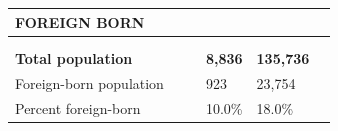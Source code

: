 \documentclass[9pt]{report}
\begin{document}
\newpage
\setlength{\tabcolsep}{.01in} %
\begin{tabular}{p{.10in}p{.10in}p{.10in}p{3.7in}>{\hfill}p{.85in}>{\hfill}p{.85in}>{\hfill}p{.85in}>{\hfill}p{.85in}p{0.1in}}
\multicolumn{9}{l}{\parbox{7.1in}{\raggedright{\large{\strut\textbf{FOREIGN BORN}\strut}}}} \\ 
\hline
\multicolumn{4}{l}{\parbox{3.5in}{\raggedright{\textbf{}}}} & \multicolumn{1}{r}{\parbox{.85in}{\strut\raggedleft{\textbf{}\strut}}} & \multicolumn{1}{r}{\parbox{.85in}{\strut\raggedleft{\textbf{}\strut}}} & \multicolumn{1}{r}{\parbox{.85in}{\strut{}}} & \multicolumn{1}{r}{\parbox{.85in}{\strut{}}} & \\ 
\multicolumn{9}{l}{} \\ 
\multicolumn{4}{l}{\parbox{3.5in}{\strut\raggedright{\textbf{Total population}\strut}}} & \textbf{} & \textbf{} & \textbf{8,836} & \textbf{135,736} & \textbf{} \\ 
\multicolumn{4}{l}{\parbox{3.6in}{\strut\raggedright{{Foreign-born population}}\strut}} &  &  & 923 & 23,754 & \multicolumn{1}{l}{}  \\ 
\multicolumn{4}{l}{\parbox{3.6in}{\strut\raggedright{{Percent foreign-born}}\strut}} &  &  & 10.0\% & 18.0\% & \multicolumn{1}{l}{}  \\ 

\end{tabular}
\setlength{\tabcolsep}{6pt} %
\end{document}
